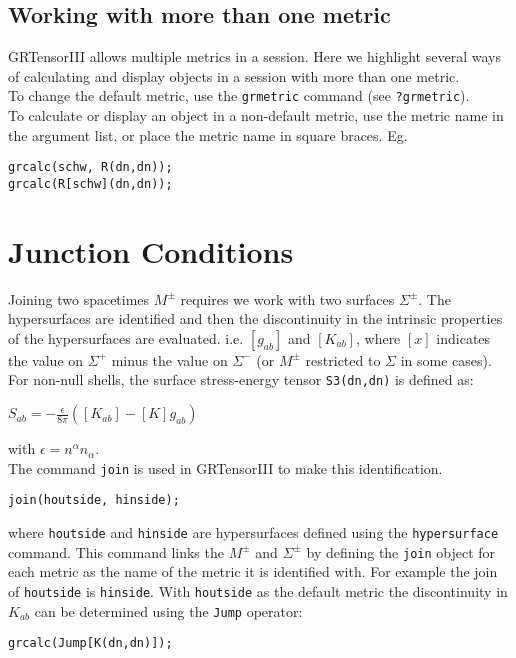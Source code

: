 \documentclass{article}
\begin{document}
\subsection{Working with more than one metric}
GRTensorIII allows multiple metrics in a session. Here we highlight several ways of calculating and display objects in a session
with more than one metric. \\

To change the default metric, use the \texttt{grmetric} command (see \texttt{?grmetric}).\\

To calculate or display an object in a non-default metric, use the metric name in the argument list, or place the metric name in 
square braces. Eg.
\begin{verbatim}
grcalc(schw, R(dn,dn));
grcalc(R[schw](dn,dn));
\end{verbatim}

\section{Junction Conditions}
Joining two spacetimes $M^{\pm}$ requires we work with two surfaces $\Sigma^{\pm}$. The hypersurfaces are identified and then
the discontinuity in the intrinsic properties of the hypersurfaces are evaluated. i.e. $\left[ g_{ab} \right]$ and
$\left[ K_{ab} \right]$, where $\left[ x \right]$ indicates the value on  $\Sigma^{+}$ minus the value on $\Sigma^{-}$
(or $M^\pm$ restricted to $\Sigma$ in some cases). \\

For non-null shells, the surface stress-energy tensor \texttt{S3(dn,dn)} is defined as:
\begin{center}
$S_{ab} = - \frac{\epsilon}{8 \pi} \left( \left[K_{ab}\right] - \left[K\right]g_{ab} \right)$
\end{center}
with $\epsilon = n^\alpha n_\alpha$. \\

The command \texttt{join} is used in GRTensorIII to make this identification.
\begin{verbatim}
join(houtside, hinside);
\end{verbatim}
where \texttt{houtside} and \texttt{hinside} are hypersurfaces defined using the \texttt{hypersurface} command. This command
links the $M^\pm$ and $\Sigma^\pm$ by defining the \texttt{join} object for each metric as the name of the metric it is identified with. 
For example the join of \texttt{houtside} is \texttt{hinside}. With \texttt{houtside} as the default metric the discontinuity in $K_{ab}$ can be determined
using the \texttt{Jump} operator:
\begin{verbatim}
grcalc(Jump[K(dn,dn)]);
\end{verbatim}
\end{document}
